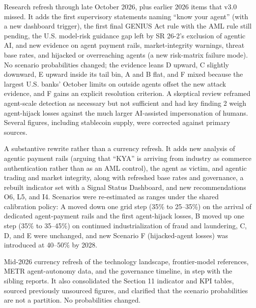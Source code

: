 \documentclass[11pt,letterpaper]{article}
\begin{document}
\begin{infobox}
Research refresh through late October 2026, plus earlier 2026 items that v3.0 missed. It adds the first supervisory statements naming ``know your agent'' (with a new dashboard trigger), the first final GENIUS Act rule with the AML rule still pending, the U.S. model-risk guidance gap left by SR 26-2's exclusion of agentic AI, and new evidence on agent payment rails, market-integrity warnings, threat base rates, and hijacked or overreaching agents (a new risk-matrix failure mode). No scenario probabilities changed; the evidence leans D upward, C slightly downward, E upward inside its tail bin, A and B flat, and F mixed because the largest U.S. banks' October limits on outside agents offset the new attack evidence, and F gains an explicit resolution criterion. A skeptical review reframed agent-scale detection as necessary but not sufficient and had key finding 2 weigh agent-hijack losses against the much larger AI-assisted impersonation of humans. Several figures, including stablecoin supply, were corrected against primary sources.
\end{infobox}

\vspace{0.3cm}

\begin{infobox}
A substantive rewrite rather than a currency refresh. It adds new analysis of agentic payment rails (arguing that ``KYA'' is arriving from industry as commerce authentication rather than as an AML control), the agent as victim, and agentic trading and market integrity, along with refreshed base rates and governance, a rebuilt indicator set with a Signal Status Dashboard, and new recommendations O6, L5, and I4. Scenarios were re-estimated as ranges under the shared calibration policy: A moved down one grid step (35\% to 25--35\%) on the arrival of dedicated agent-payment rails and the first agent-hijack losses, B moved up one step (35\% to 35--45\%) on continued industrialization of fraud and laundering, C, D, and E were unchanged, and new Scenario F (hijacked-agent losses) was introduced at 40--50\% by 2028.
\end{infobox}

\vspace{0.3cm}

\begin{infobox}
Mid-2026 currency refresh of the technology landscape, frontier-model references, METR agent-autonomy data, and the governance timeline, in step with the sibling reports. It also consolidated the Section 11 indicator and KPI tables, sourced previously unsourced figures, and clarified that the scenario probabilities are not a partition. No probabilities changed.
\end{infobox}
\end{document}

